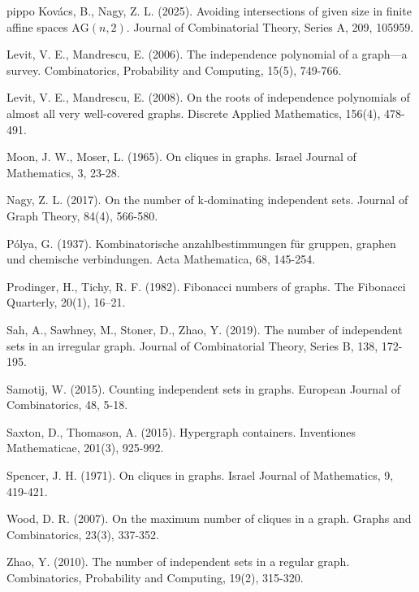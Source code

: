 \documentclass[10pt,a4paper]{article}
\numberwithin{equation}{section}
\begin{document}
{\begin{thebibliography}{pippo}
Kovács, B.,  Nagy, Z. L. (2025). Avoiding intersections of given size in finite affine spaces $\mathrm{AG}(n,2)$. Journal of Combinatorial Theory, Series A, 209, 105959.

 Levit, V. E., Mandrescu, E.  (2006). The independence polynomial of a graph—a survey. Combinatorics, Probability and Computing, 15(5), 749-766.

 Levit, V. E.,  Mandrescu, E. (2008). On the roots of independence polynomials of almost all very well-covered graphs. Discrete Applied Mathematics, 156(4), 478-491.

 Moon, J. W.,  Moser, L. (1965). On cliques in graphs. Israel Journal of Mathematics, 3, 23-28.

 Nagy, Z. L. (2017). On the number of k‐dominating independent sets. Journal of Graph Theory, 84(4), 566-580.

 Pólya, G. (1937). Kombinatorische anzahlbestimmungen für gruppen, graphen und chemische verbindungen. Acta Mathematica, 68, 145-254.

Prodinger, H., Tichy, R. F. (1982). Fibonacci numbers of graphs. The Fibonacci Quarterly, 20(1), 16–21.

 Sah, A., Sawhney, M., Stoner, D.,  Zhao, Y. (2019). The number of independent sets in an irregular graph. Journal of Combinatorial Theory, Series B, 138, 172-195.

 Samotij, W. (2015). Counting independent sets in graphs. European Journal of Combinatorics, 48, 5-18.

 Saxton, D.,  Thomason, A. (2015). Hypergraph containers. Inventiones Mathematicae, 201(3), 925-992.

 Spencer, J. H. (1971). On cliques in graphs. Israel Journal of Mathematics, 9, 419-421.

 Wood, D. R. (2007). On the maximum number of cliques in a graph. Graphs and Combinatorics, 23(3), 337-352.

 Zhao, Y. (2010). The number of independent sets in a regular graph. Combinatorics, Probability and Computing, 19(2), 315-320.
\end{thebibliography}}
\end{document}
